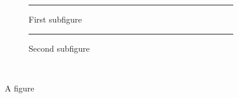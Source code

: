 \documentclass{beamer}
\begin{document}
\begin{frame}
\begin{figure}
  \begin{subfigure}[b]{.45\linewidth}
    \centering
    \textcolor{blue}{\rule{3cm}{3cm}}
    \caption{First subfigure}
    \label{fig:a}
  \end{subfigure}\hfill
  \begin{subfigure}[b]{.45\linewidth}
    \centering
    \caption{Second subfigure}
    \label{fig:b}
    \textcolor{blue}{\rule{3cm}{3cm}}
  \end{subfigure}\\
\caption{A figure}\label{fig:1}
\end{figure}
\end{frame}
\end{document}
